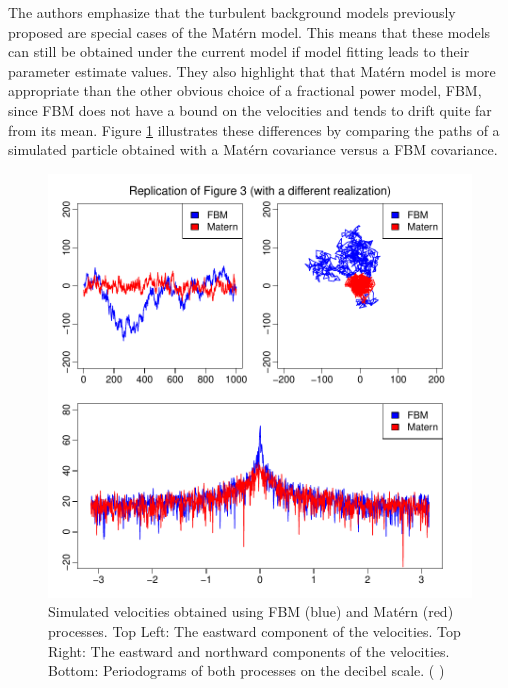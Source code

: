\documentclass{stat572Style}
\newcommand{\vmcomment}[1]{({\color{blue}{VM's comment:}} \textbf{\color{blue}{#1}})}
\begin{document}
The authors emphasize that the turbulent background models previously proposed are special cases of the Mat\'{e}rn model. 
This means that these models can still be obtained under the current model if model fitting leads to their parameter estimate values. 
They also highlight that that Mat\'{e}rn model is more appropriate than the other obvious choice of a fractional power model, FBM, since FBM does not have a bound on the velocities and tends to drift quite far from its mean.
 Figure \ref{fig: fmbMat} illustrates these differences by comparing the paths of a simulated particle obtained with a Mat\'{e}rn  covariance versus a FBM covariance. 

\begin{figure}[h!]
  \centering
    \includegraphics[width=.9\textwidth]{ReplicatedFigures/fig3.pdf}
        \caption{Simulated velocities obtained using FBM (blue) and Mat\'{e}rn (red)  processes. Top Left: The eastward component of the velocities. Top Right: The eastward and northward components of the velocities. Bottom: Periodograms of both processes on the decibel scale. \vmcomment{Label all axes.}}
        	\label{fig: fmbMat}
\end{figure}
\end{document}
